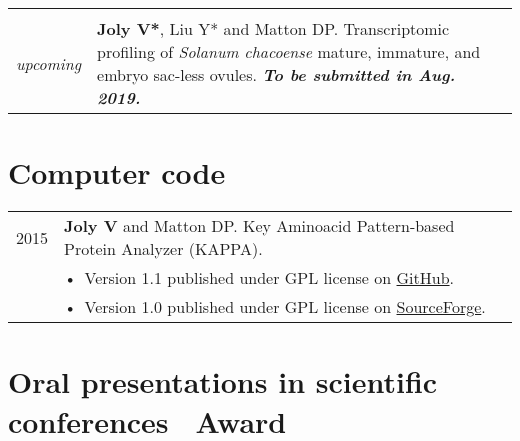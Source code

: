 \documentclass[letterpaper,12pt]{article}
\begin{document}
\begin{tabularx}{\textwidth}{@{}r|X@{}}
%

\multicolumn{2}{c}{} \\

{\em upcoming}
& \textbf{Joly V*}, Liu Y* and Matton DP.
  Transcriptomic profiling of \emph{Solanum chacoense} mature, immature, and
  embryo sac-less ovules.
  {\bfseries\em To be submitted in Aug. 2019.}
  \vspace{3mm}
  \\

\end{tabularx}

\vspace{6mm}

\section[Computer code]{Computer code}

\begin{tabularx}{\textwidth}{@{}r|X@{}}

2015
& \textbf{Joly V} and Matton DP. Key Aminoacid Pattern-based Protein Analyzer
  (KAPPA). \\
& \small \hspace{1.5mm} •~Version 1.1 published under GPL license on
  \href{https://github.com/valentinjoly/kappa-1.1}{GitHub}. \\
& \small \hspace{1.5mm} •~Version 1.0 published under GPL license on
  \href{https://sourceforge.net/projects/kappa-sequence-search/}{SourceForge}.
  \\

\end{tabularx}

\newpage

\section[Oral presentations]{Oral presentations
         \small in scientific conferences \hfill {\mdseries\faStar}~Award}
\end{document}
